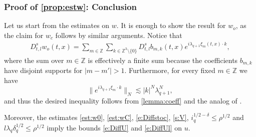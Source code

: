 \documentclass[10pt,a4paper]{amsart}
\numberwithin{equation}{section}
\numberwithin{corollario}{section}
\numberwithin{lemma}{section}
\numberwithin{prop}{section}
\theoremstyle{definition}
\theoremstyle{remark}
\newcommand{\Z}{\mathbb{Z}}
\newcommand{\qq}{_{q+1}}
\begin{document}
\subsubsection{Proof of \autoref{prop:estw}: Conclusion}
Let us start from the estimates on $w$.
It is enough to show the result for $w_o$, as the claim for $w_c$ follows by similar arguments.
Notice that 
 \begin{align}
     D_{t,l}^s w_o (t,x)
     =
     \sum_{m\in\Z}\sum_{k\in \Z^3\setminus\{0\}}D_{t,l}^s b_{m,k} (t,x)e^{i\lambda_{q+1} \xi_m(t,x)\cdot k},
 \end{align}
where the sum over $m \in \Z$ is effectively a finite sum because the coefficients $b_{m,k}$ have disjoint supports for $|m-m'|>1$. Furthermore, for every fixed $m \in \Z$ we have  
\begin{equation}\label{i:FourierBasisFlux}
    \|e^{i \lambda\qq \xi_m \cdot k}\|_N\lesssim |k|^N \lambda^N_{ q+1},
\end{equation}
and thus the desired inequality follows from  \autoref{lemma:coeff} and the analog of \cite[Equation (3.24)]{DLK23}.

Moreover, the estimates \eqref{est:w0}, \eqref{est:wC}, \eqref{e:Diffstoc}, \eqref{s:V}, $i_q^{1/2-\delta}\le \rho^{1/2}$ and $l\lambda_q\delta_q^{1/2}\le \rho^{1/2}$ imply the bounds \eqref{e:DiffU} and \eqref{e:DiffUl} on $u$. 
\end{document}
